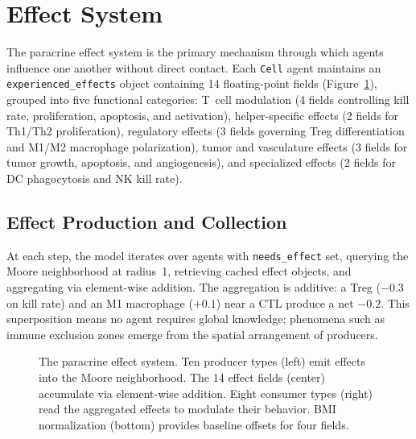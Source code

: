 \section{Effect System}
\label{sec:md_effects}

The paracrine effect system is the primary mechanism through which agents influence one another without direct contact.  Each \texttt{Cell} agent maintains an \texttt{experienced\_effects} object containing 14 floating-point fields (Figure~\ref{fig:effect_system}), grouped into five functional categories: T~cell modulation (4 fields controlling kill rate, proliferation, apoptosis, and activation), helper-specific effects (2 fields for Th1/Th2 proliferation), regulatory effects (3 fields governing Treg differentiation and M1/M2 macrophage polarization), tumor and vasculature effects (3 fields for tumor growth, apoptosis, and angiogenesis), and specialized effects (2 fields for DC phagocytosis and NK kill rate).

\subsection{Effect Production and Collection}
\label{subsec:md_effect_pipeline}

At each step, the model iterates over agents with \texttt{needs\_effect} set, querying the Moore neighborhood at radius~1, retrieving cached effect objects, and aggregating via element-wise addition.  The aggregation is additive: a Treg ($-0.3$ on kill rate) and an M1 macrophage ($+0.1$) near a CTL produce a net $-0.2$.  This superposition means no agent requires global knowledge; phenomena such as immune exclusion zones emerge from the spatial arrangement of producers.

\begin{figure}[htbp]
\centering
{}
\caption{The paracrine effect system.  Ten producer types (left) emit effects into the Moore neighborhood.  The 14 effect fields (center) accumulate via element-wise addition.  Eight consumer types (right) read the aggregated effects to modulate their behavior.  BMI normalization (bottom) provides baseline offsets for four fields.}
\label{fig:effect_system}
\end{figure}

\FloatBarrier
